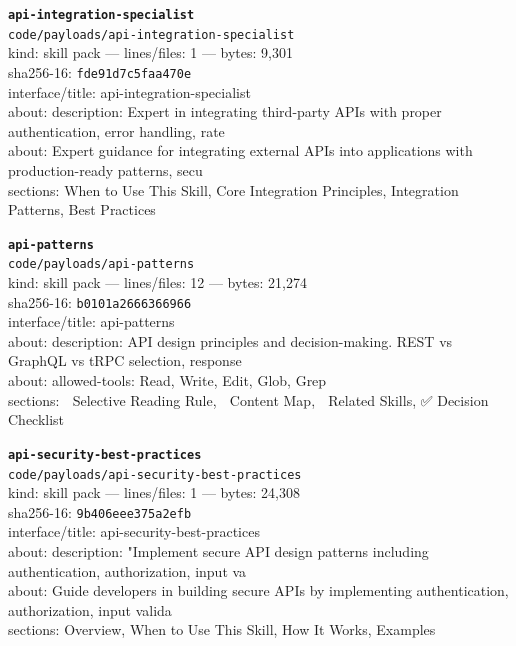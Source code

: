 \noindent\textbf{\texttt{api-integration-specialist}}\\
\texttt{code/payloads/api-integration-specialist}\\
kind: skill pack --- lines/files: 1 --- bytes: 9,301\\
sha256-16: \texttt{fde91d7c5faa470e}\\
interface/title: api-integration-specialist\\
about: description: Expert in integrating third-party APIs with proper authentication, error handling, rate\\
about: Expert guidance for integrating external APIs into applications with production-ready patterns, secu\\
sections: When to Use This Skill, Core Integration Principles, Integration Patterns, Best Practices\\
\vspace*{6.0pt}

\noindent\textbf{\texttt{api-patterns}}\\
\texttt{code/payloads/api-patterns}\\
kind: skill pack --- lines/files: 12 --- bytes: 21,274\\
sha256-16: \texttt{b0101a2666366966}\\
interface/title: api-patterns\\
about: description: API design principles and decision-making. REST vs GraphQL vs tRPC selection, response \\
about: allowed-tools: Read, Write, Edit, Glob, Grep\\
sections: 🎯 Selective Reading Rule, 📑 Content Map, 🔗 Related Skills, ✅ Decision Checklist\\
\vspace*{6.0pt}

\noindent\textbf{\texttt{api-security-best-practices}}\\
\texttt{code/payloads/api-security-best-practices}\\
kind: skill pack --- lines/files: 1 --- bytes: 24,308\\
sha256-16: \texttt{9b406eee375a2efb}\\
interface/title: api-security-best-practices\\
about: description: "Implement secure API design patterns including authentication, authorization, input va\\
about: Guide developers in building secure APIs by implementing authentication, authorization, input valida\\
sections: Overview, When to Use This Skill, How It Works, Examples\\
\vspace*{6.0pt}

